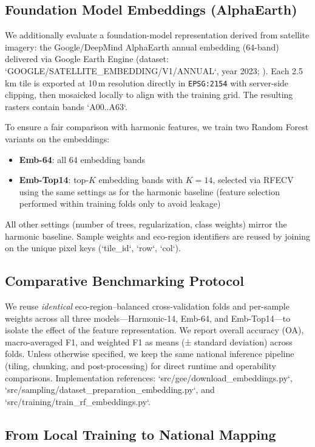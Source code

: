 \documentclass[utf8]{FrontiersinHarvard}
\begin{document}
\subsection{Foundation Model Embeddings (AlphaEarth)}

We additionally evaluate a foundation-model representation derived from satellite imagery: the Google/DeepMind AlphaEarth annual embedding (64-band) delivered via Google Earth Engine (dataset: `GOOGLE/SATELLITE_EMBEDDING/V1/ANNUAL`, year 2023; \citealp{AlphaEarth2025}). Each 2.5\,km tile is exported at 10\,m resolution directly in \texttt{EPSG:2154} with server-side clipping, then mosaicked locally to align with the training grid. The resulting rasters contain bands `A00..A63`.

To ensure a fair comparison with harmonic features, we train two Random Forest variants on the embeddings:
\begin{itemize}
    \item \textbf{Emb-64}: all 64 embedding bands
    \item \textbf{Emb-Top14}: top-$K$ embedding bands with $K{=}14$, selected via RFECV using the same settings as for the harmonic baseline (feature selection performed within training folds only to avoid leakage)
\end{itemize}

All other settings (number of trees, regularization, class weights) mirror the harmonic baseline. Sample weights and eco-region identifiers are reused by joining on the unique pixel keys (`tile\_id`, `row`, `col`).

\subsection{Comparative Benchmarking Protocol}

We reuse \emph{identical} eco-region–balanced cross-validation folds and per-sample weights across all three models—Harmonic-14, Emb-64, and Emb-Top14—to isolate the effect of the feature representation. We report overall accuracy (OA), macro-averaged F1, and weighted F1 as means (± standard deviation) across folds. Unless otherwise specified, we keep the same national inference pipeline (tiling, chunking, and post-processing) for direct runtime and operability comparisons. Implementation references: `src/gee/download_embeddings.py`, `src/sampling/dataset_preparation_embedding.py`, and `src/training/train_rf_embeddings.py`.

\subsection{From Local Training to National Mapping}
\end{document}
